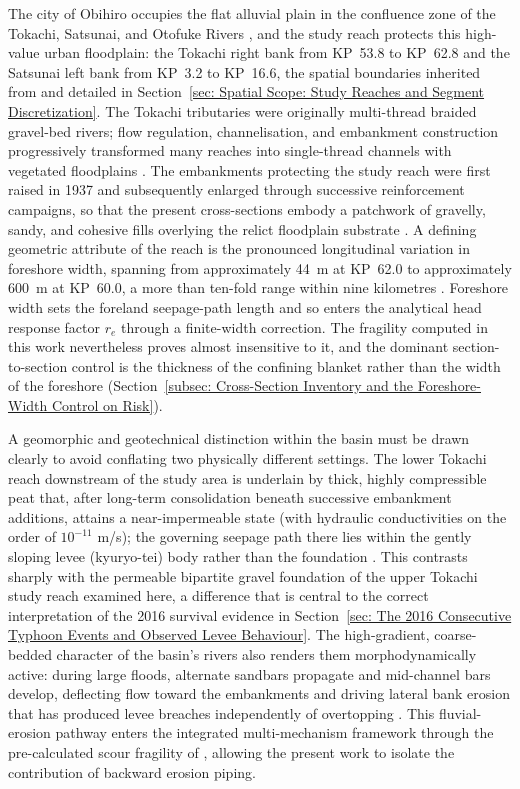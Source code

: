 The city of Obihiro occupies the flat alluvial plain in the confluence zone of the Tokachi, Satsunai, and Otofuke Rivers \parencite{kimura_2018}, and the study reach protects this high-value urban floodplain: the Tokachi right bank from KP~53.8 to KP~62.8 and the Satsunai left bank from KP~3.2 to KP~16.6, the spatial boundaries inherited from \textcite{uemura_phd_2025} and detailed in Section~\ref{sec: Spatial Scope: Study Reaches and Segment Discretization}. The Tokachi tributaries were originally multi-thread braided gravel-bed rivers; flow regulation, channelisation, and embankment construction progressively transformed many reaches into single-thread channels with vegetated floodplains \parencite{kyuka_2020}. The embankments protecting the study reach were first raised in 1937 and subsequently enlarged through successive reinforcement campaigns, so that the present cross-sections embody a patchwork of gravelly, sandy, and cohesive fills overlying the relict floodplain substrate \parencite{oyo_1999, fukuda_2025_internal}. A defining geometric attribute of the reach is the pronounced longitudinal variation in foreshore width, spanning from approximately 44~m at KP~62.0 to approximately 600~m at KP~60.0, a more than ten-fold range within nine kilometres \parencite{oyo_1999}. Foreshore width sets the foreland seepage-path length and so enters the analytical head response factor $r_e$ through a finite-width correction. The fragility computed in this work nevertheless proves almost insensitive to it, and the dominant section-to-section control is the thickness of the confining blanket rather than the width of the foreshore (Section~\ref{subsec: Cross-Section Inventory and the Foreshore-Width Control on Risk}).

A geomorphic and geotechnical distinction within the basin must be drawn clearly to avoid conflating two physically different settings. The lower Tokachi reach downstream of the study area is underlain by thick, highly compressible peat that, after long-term consolidation beneath successive embankment additions, attains a near-impermeable state (with hydraulic conductivities on the order of $10^{-11}$ m/s); the governing seepage path there lies within the gently sloping levee (kyuryo-tei) body rather than the foundation \parencite{fukuoka_2019}. This contrasts sharply with the permeable bipartite gravel foundation of the upper Tokachi study reach examined here, a difference that is central to the correct interpretation of the 2016 survival evidence in Section~\ref{sec: The 2016 Consecutive Typhoon Events and Observed Levee Behaviour}. The high-gradient, coarse-bedded character of the basin's rivers also renders them morphodynamically active: during large floods, alternate sandbars propagate and mid-channel bars develop, deflecting flow toward the embankments and driving lateral bank erosion that has produced levee breaches independently of overtopping \parencite{kyuka_2020}. This fluvial-erosion pathway enters the integrated multi-mechanism framework through the pre-calculated scour fragility of \textcite{uemura_phd_2025}, allowing the present work to isolate the contribution of backward erosion piping.

